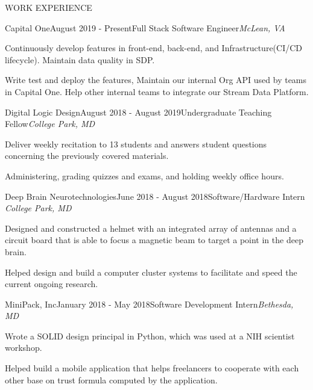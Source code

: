 \documentclass{resume} %
\begin{document}

\begin{rSection}{\small WORK EXPERIENCE} \itemsep -2pt

\small %
\begin{rSubsection}{Capital One}{August 2019 - Present}{Full Stack Software Engineer}{\em McLean, VA}
\item Continuously develop features in front-end, back-end, and Infrastructure(CI/CD lifecycle). Maintain data quality in SDP.
\item Write test and deploy the features, Maintain our internal Org API used by teams in Capital One. Help other internal teams to integrate our Stream Data Platform.
\end{rSubsection}
\begin{rSubsection}{Digital Logic Design}{August 2018 - August 2019}{Undergraduate Teaching Fellow}{\em College Park, MD}
\item Deliver weekly recitation to 13 students and answers student questions concerning the previously covered materials.
\item Administering, grading quizzes and exams, and holding weekly office hours.
\end{rSubsection}
\begin{rSubsection}{Deep Brain Neurotechnologies}{June 2018 - August 2018}{Software/Hardware Intern} {\em College Park, MD}
\item Designed and constructed a helmet with an integrated array of antennas and a circuit board that is able to focus a magnetic beam to target a point in the deep brain.
\item Helped design and build a computer cluster systems to facilitate and speed the current ongoing research.
\end{rSubsection}

\begin{rSubsection}{MiniPack, Inc}{January 2018 - May 2018}{Software Development Intern}{\em Bethesda, MD}
\item Wrote a SOLID design principal in Python, which was used at a NIH scientist workshop.
\item Helped build a mobile application that helps freelancers to cooperate with each other base on trust formula computed by the application.
\end{rSubsection}


\end{rSection}
\end{document}
